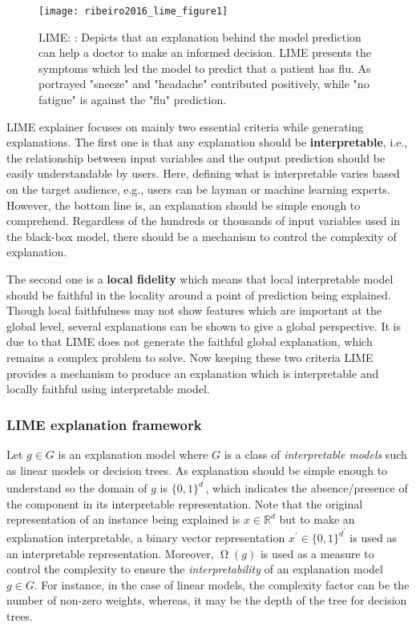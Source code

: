 \documentclass[english]{tktltiki2}
\theoremstyle{definition}
\theoremstyle{remark}
\begin{document}
\begin{figure}[H]
	\texttt{[image: ribeiro2016\_lime\_figure1]}
	\vspace*{-10mm}
	\caption{LIME: \citep{ribeiro2016should}: Depicts that an explanation behind the model prediction can help a doctor to make an informed decision. LIME presents the symptoms which led the model to predict that a patient has flu. As portrayed "sneeze" and "headache" contributed positively, while "no fatigue" is against the "flu" prediction. }
	\label{fig:ribeiro2016_lime_figure1}
\end{figure}

LIME \citep{ribeiro2016should} explainer focuses on mainly two essential criteria while generating explanations. The first one is that any explanation should be \textbf{interpretable}, i.e., the relationship between input variables and the output prediction should be easily understandable by users. Here, defining what is interpretable varies based on the target audience, e.g., users can be layman or machine learning experts. However, the bottom line is, an explanation should be simple enough to comprehend. Regardless of the hundreds or thousands of input variables used in the black-box model, there should be a mechanism to control the complexity of explanation.

The second one is a \textbf{local fidelity} which means that local interpretable model should be faithful in the locality around a point of prediction being explained. Though local faithfulness may not show features which are important at the global level, several explanations can be shown to give a global perspective. It is due to that LIME does not generate the faithful global explanation, which remains a complex problem to solve. Now keeping these two criteria LIME \citep{ribeiro2016should} provides a mechanism to produce an explanation which is interpretable and locally faithful using interpretable model.

\subsubsection{LIME explanation framework} %
Let $g \in G$ is an explanation model where $G$ is a class of \textit{interpretable models} such as linear models or decision trees. As explanation should be simple enough to understand so the domain of  $g$ is $\{0, 1\}^{d^\prime}$, which indicates the absence/presence of the component in its interpretable representation. Note that the original representation of an instance being explained is $x \in \mathbb{R}^d$ but to make an explanation interpretable, a binary vector representation $x^\prime \in \{0, 1\}^{d^\prime}$ is used as an interpretable representation. Moreover, $\upOmega(g)$ is used as a measure to control the complexity to ensure the \textit{interpretability} of an explanation model $g \in G$. For instance, in the case of linear models, the complexity factor can be the number of non-zero weights, whereas, it may be the depth of the tree for decision trees.
\end{document}
